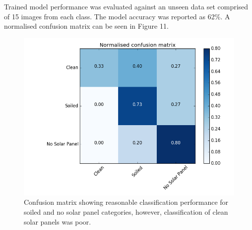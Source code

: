 \documentclass[10pt,journal,compsoc]{IEEEtran}
\begin{document}
		Trained model performance was evaluated against an unseen data set comprised of 15 images from each class. The model accuracy was reported as 62\%. A normalised confusion matrix can be seen in Figure 11.
		\begin{figure}[h]
			\centering
			\includegraphics[scale=0.37]{confusion_matrix}
			\caption{Confusion matrix showing reasonable classification performance for soiled and no solar panel categories, however, classification of clean solar panels was poor.}
		\end{figure}
			
\end{document}

